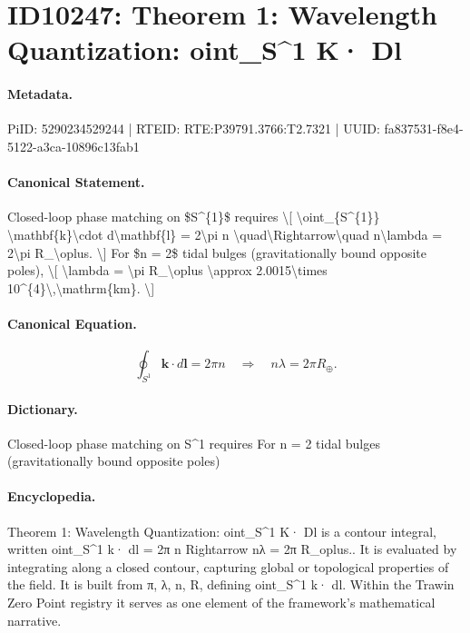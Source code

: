 \section*{ID10247: Theorem 1: Wavelength Quantization: oint\_S\textasciicircum{}1 K· Dl}
\paragraph{Metadata.}
PiID: 5290234529244 | RTEID: RTE:P39791.3766:T2.7321 | UUID: fa837531-f8e4-5122-a3ca-10896c13fab1

\paragraph{Canonical Statement.}
Closed-loop phase matching on \$S\textasciicircum{}\{1\}\$ requires \textbackslash{}[ \textbackslash{}oint\_\{S\textasciicircum{}\{1\}\} \textbackslash{}mathbf\{k\}\textbackslash{}cdot d\textbackslash{}mathbf\{l\} = 2\textbackslash{}pi n \textbackslash{}quad\textbackslash{}Rightarrow\textbackslash{}quad n\textbackslash{}lambda = 2\textbackslash{}pi R\_\textbackslash{}oplus. \textbackslash{}] For \$n = 2\$ tidal bulges (gravitationally bound opposite poles), \textbackslash{}[ \textbackslash{}lambda = \textbackslash{}pi R\_\textbackslash{}oplus \textbackslash{}approx 2.0015\textbackslash{}times 10\textasciicircum{}\{4\}\textbackslash{},\textbackslash{}mathrm\{km\}. \textbackslash{}]

\paragraph{Canonical Equation.}
\[
\oint_{S^{1}} \mathbf{k}\cdot d\mathbf{l} = 2\pi n \quad\Rightarrow\quad n\lambda = 2\pi R_\oplus.
\]

\paragraph{Dictionary.}
Closed-loop phase matching on S\textasciicircum{}1 requires For n = 2 tidal bulges (gravitationally bound opposite poles)

\paragraph{Encyclopedia.}
Theorem 1: Wavelength Quantization: oint\_S\textasciicircum{}1 K· Dl is a contour integral, written oint\_S\textasciicircum{}1 k· dl = 2π n Rightarrow nλ = 2π R\_oplus.. It is evaluated by integrating along a closed contour, capturing global or topological properties of the field. It is built from π, λ, n, R, defining oint\_S\textasciicircum{}1 k· dl. Within the Trawin Zero Point registry it serves as one element of the framework's mathematical narrative.
